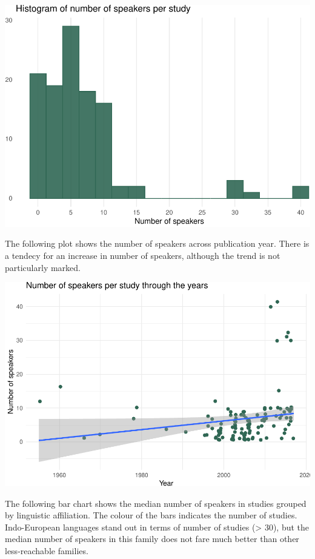 \documentclass[12pt,a4paper,]{article}
\begin{document}
\includegraphics{2020-os_files/figure-latex/hist-1.pdf}

The following plot shows the number of speakers across publication year.
There is a tendecy for an increase in number of speakers, although the
trend is not particularly marked.

\includegraphics{2020-os_files/figure-latex/year-1.pdf}

The following bar chart shows the median number of speakers in studies
grouped by linguistic affiliation. The colour of the bars indicates the
number of studies. Indo-European languages stand out in terms of number
of studies (\textgreater{} 30), but the median number of speakers in
this family does not fare much better than other less-reachable
families.
\end{document}
